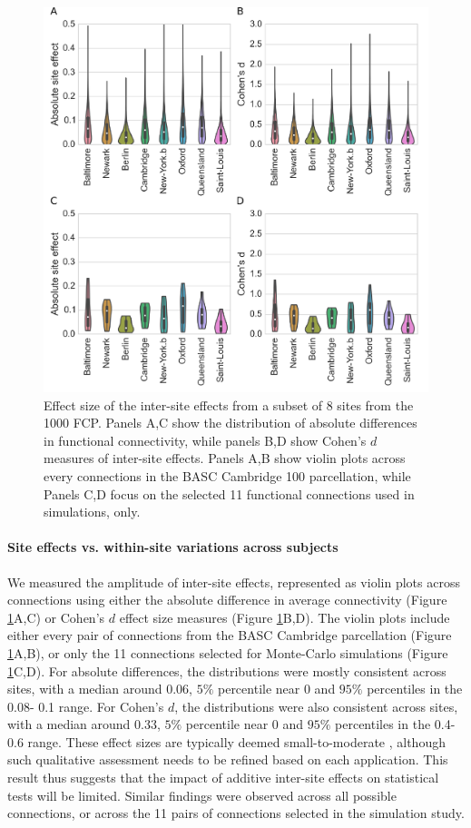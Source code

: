 \documentclass[authoryear]{elsarticle}
\begin{document}
\begin{figure}[htbp]
\begin{center}
\includegraphics[width=0.8\linewidth]{../figures/effect_distribution.png}
\end{center}
\caption[inter site variability]{
Effect size of the inter-site effects from a subset of 8 sites from the 1000 FCP. Panels A,C show the distribution of absolute differences in functional connectivity, while panels B,D show Cohen's $d$ measures of inter-site effects. Panels A,B show violin plots across every connections in the BASC Cambridge 100 parcellation, while Panels C,D focus on the selected 11 functional connections used in simulations, only. 
}
\label{fig_site_variability}
\end{figure}


\paragraph{Site effects vs. within-site variations across subjects} We measured the amplitude of inter-site effects, represented as violin plots across connections using either the absolute difference in average connectivity (Figure \ref{fig_site_variability}A,C) or Cohen's $d$ effect size measures (Figure \ref{fig_site_variability}B,D). The violin plots include either every pair of connections from the BASC Cambridge parcellation (Figure \ref{fig_site_variability}A,B), or only the 11 connections selected for Monte-Carlo
simulations (Figure \ref{fig_site_variability}C,D). For absolute differences, the distributions were mostly consistent across sites, with a
median around 0.06, $5\%$ percentile near 0 and $95\%$ percentiles in the 0.08-
0.1 range. For Cohen's $d$, the distributions were also consistent across sites, with a
median around 0.33, $5\%$ percentile near 0 and $95\%$ percentiles in the 0.4-
0.6 range. These effect sizes are typically deemed small-to-moderate \citep{Cohen1992}, although such qualitative assessment needs to be refined based on each application. This result thus suggests that the impact of additive inter-site effects on statistical tests will be limited. Similar findings were observed across all possible connections, or across the 11 pairs of
connections selected in the simulation study. 
\end{document}
